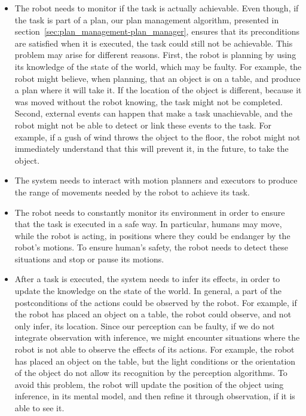 \begin{itemize}
\item The robot needs to monitor if the task is actually achievable. Even though, if the task is part of a plan, our plan management algorithm, presented in section~\ref{sec:plan_management-plan_manager}, ensures that its preconditions are satisfied when it is executed, the task could still not be achievable. This problem may arise for different reasons. First, the robot is planning by using its knowledge of the state of the world, which may be faulty. For example, the robot might believe, when planning, that an object is on a table, and produce a plan where it will take it. If the location of the object is different, because it was moved without the robot knowing, the task might not be completed. Second, external events can happen that make a task unachievable, and the robot might not be able to detect or link these events to the task. For example, if a gush of wind throws the object to the floor, the robot might not immediately understand that this will prevent it, in the future, to take the object.
\item The system needs to interact with motion planners and executors to produce the range of movements needed by the robot to achieve its task.
\item The robot needs to constantly monitor its environment in order to ensure that the task is executed in a safe way. In particular, humans may move, while the robot is acting, in positions where they could be endanger by the robot's motions. To ensure human's safety, the robot needs to detect these situations and stop or pause its motions.
\item After a task is executed, the system needs to infer its effects, in order to update the knowledge on the state of the world. In general, a part of the postconditions of the actions could be observed by the robot. For example, if the robot has placed an object on a table, the robot could observe, and not only infer, its location. Since our perception can be faulty, if we do not integrate observation with inference, we might encounter situations where the robot is not able to observe the effects of its actions. For example, the robot has placed an object on the table, but the light conditions or the orientation of the object do not allow its recognition by the perception algorithms. To avoid this problem, the robot will update the position of the object using inference, in its mental model, and then refine it through observation, if it is able to see it.
\end{itemize}

